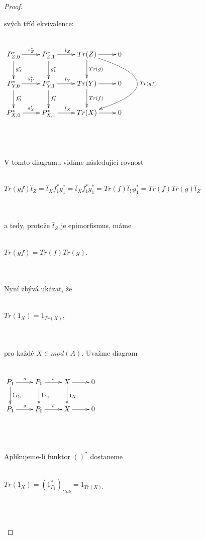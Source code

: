 \begin{proof}
\begin{description}
           svých tříd ekvivalence:
           \\\\\centerline{$\xymatrix{
                P_{Z,0}^* \ar[r]^{s_Z^*} \ar[d]^{g_0^*}
             & P_{Z,1}^* \ar[r]^{\hat t_Z} \ar[d]^{g_1^*}
             & Tr(Z) \ar[r]  \ar[d]^{Tr(g)} \ar@/^6pc/[dd]^{Tr(gf)}
             & 0 \\
                P_{Y,0}^* \ar[r]^{s_Y^*} \ar[d]^{f_0^*}
             & P_{Y,1}^* \ar[r]^{\hat t_Y} \ar[d]^{f_1^*}
             & Tr(Y) \ar[r]  \ar[d]^{Tr(f)}
             & 0 \\
                P_{X,0}^* \ar[r]^{s_X^*} 
             & P_{X,1}^* \ar[r]^{\hat t_X}
             & Tr(X) \ar[r]
             & 0
           }$} \\\\\\
          V tomto diagramu vidíme následující rovnost
           \\\\\centerline{$
             Tr(gf)\hat t_Z
             =\hat t_X f_1^*g_1^*
             =\hat t_X f_1^*g_1^*
             = Tr(f) \hat t_Y g_1^*
             = Tr(f)Tr(g)\hat t_Z$}\\\\
           a tedy, protože $\hat t_Z$ je epimorfismus, máme
           \\\\\centerline{$Tr(gf)=Tr(f)Tr(g)$.}\\\\
           Nyní zbývá ukázat, že
           \\\\\centerline{$Tr(1_X)=1_{Tr(X)}$,}\\\\
           pro každé $X\in\underline{mod}(A)$. Uvažme diagram
           \\\\\centerline{$\xymatrix{
                P_{1} \ar[r]^{s} \ar[d]^{1_{P_0}}
             & P_{0} \ar[r]^{t} \ar[d]^{1_{P_1}}
             & X \ar[r]  \ar[d]^{1_X}
             & 0 \\
                P_{1} \ar[r]^{s} 
             & P_{0} \ar[r]^{t}
             & X \ar[r]
             & 0
           }$} \\\\\\
           Aplikujeme-li funktor $()^*$ dostaneme
           \\\\\centerline{$Tr(1_X)=(1_{P_1}^*)_{Cok}=1_{Tr(X).}$}\\\\
       \end{description}
     \end{proof}
     

